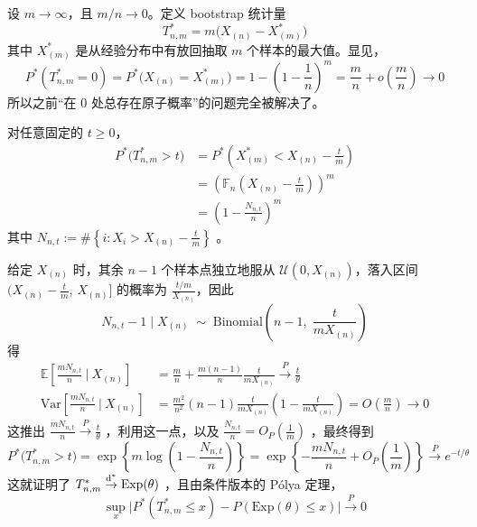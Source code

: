 \begin{example}
\label{ex:ch11:m-out-of-n}

设 $m\to\infty$，且 $m/n\to 0$。定义 bootstrap 统计量
\[T_{n,m}^* = m\big(X_{(n)}-X_{(m)}^*\big)\]
其中 $X_{(m)}^*$ 是从经验分布中有放回抽取 $m$ 个样本的最大值。显见， \[ P^*(T_{n,m}^*=0)=P^*\big(X_{(n)}=X_{(m)}^*\big)=1-\left(1-\frac1n\right)^m=\frac mn+o\left(\frac mn\right)\to 0 \]所以之前``在 0 处总存在原子概率''的问题完全被解决了。

对任意固定的 $t \ge 0$，
\[ \begin{aligned} P^*\bigl(T_{n,m}^* > t\bigr) &= P^*\left(X_{(m)}^* < X_{(n)} - \frac{t}{m}\right) \\ &= \left(\mathbb F_n\!\left(X_{(n)} - \frac{t}{m}\right)\right)^m \\ &=\left(1-\frac {N_{n,t}}n\right)^m \end{aligned} \]其中 $N_{n,t} := \#\left\{i : X_i > X_{(n)} - \tfrac{t}{m}\right\}$ 。

给定 $X_{(n)}$ 时，其余 $n-1$ 个样本点独立地服从 $\mathcal{U}(0, X_{(n)})$，落入区间 $\bigl(X_{(n)} - \frac{t}{m},\, X_{(n)}\bigr]$ 的概率为 $\tfrac{t/m}{X_{(n)}}$，因此
\[N_{n,t} - 1 \mid X_{(n)} \;\sim\; \mathrm{Binomial}\left(n-1,\; \frac{t}{m X_{(n)}}\right)\]
得
\[\begin{aligned} \mathbb{E}\left[\frac{m N_{n,t}}{n} \ \bigg|\  X_{(n)}\right] &=\frac{m}{n}+\frac{m(n-1)}{n}\frac{t}{m X_{(n)}} \overset P\to \frac{t}{\theta}\\  \mathrm{Var}\left[\frac{m N_{n,t}}{n} \ \bigg|\  X_{(n)}\right] &= \frac{m^2}{n^2}(n-1)\frac{t}{m X_{(n)}}\left(1-\frac{t}{m X_{(n)}}\right) = O\left(\frac{m}{n}\right) \to 0  \end{aligned}\]
这推出 $\tfrac{mN_{n,t}}{n}\overset{P}\to\tfrac t\theta$ ，利用这一点，以及 $\tfrac{N_{n,t}}{n}=O_{P}\left(\tfrac1m\right)$ ，最终得到
\[P^*\bigl(T_{n,m}^* > t\bigr) = \exp\!\left\{m\log\!\left(1 - \frac{N_{n,t}}{n}\right)\right\}=\exp\left\{-\frac {mN_{n,t}}{n}+O_{P}\left(\frac 1m\right)\right\} \overset{P}\longrightarrow e^{-t/\theta}\]
这就证明了 $T_{n,m}^*\overset{\rm d^*}\to\mathrm{Exp}(\theta)$ ，且由条件版本的 Pólya 定理，
\[\sup_x \bigl| P^*(T_{n,m}^* \le x) - P(\mathrm{Exp}(\theta) \le x) \bigr| \xrightarrow{P} 0\]
\end{example}

